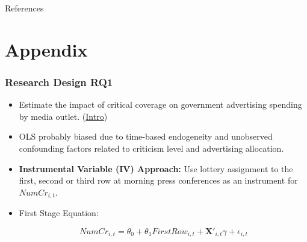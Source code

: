 \documentclass[12pt]{beamer}
\begin{document}
\begin{frame}{References}
\tiny
    
    \typeout{}

    \singlespacing
    
    
    
\end{frame}

\section{Appendix}

\begin{frame}
\frametitle{Research Design RQ1}
\label{slide:lottery}
\small
\begin{itemize}
    \item Estimate the impact of critical coverage on government advertising spending by media outlet. (\hyperlink{slide:intro}{Intro})
    \item OLS probably biased due to time-based endogeneity and unobserved confounding factors related to criticism level and advertising allocation.
    \item \textbf{Instrumental Variable (IV) Approach:} Use lottery assignment to the first, second or third row at morning press conferences as an instrument for $NumCr_{i, t}$.
\item First Stage Equation:

$$NumCr_{i, t} = \theta_0 + \theta_1 FirstRow_{i, t} + \mathbf{X'}_{i,t}\gamma + \epsilon_{i, t}$$
\end{itemize}

\end{frame}
\end{document}
